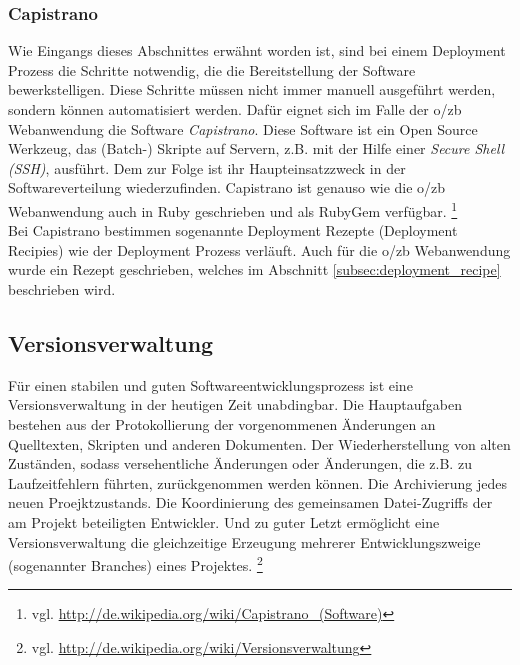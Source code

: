 \documentclass[12pt,             %
               a4paper,          %
               listof=totoc,     %
               index=totoc,      %
               bibliography=totoc,%
               oneside,         %
               BCOR1cm,          %
               english   %
               ]{scrbook}
\begin{document}
\subsubsection{Capistrano}
Wie Eingangs dieses Abschnittes erwähnt worden ist, sind bei einem Deployment Prozess die Schritte notwendig, die die Bereitstellung der Software bewerkstelligen. Diese Schritte müssen nicht immer manuell ausgeführt werden, sondern können automatisiert werden. Dafür eignet sich im Falle der o/zb Webanwendung die Software \textit{Capistrano}. Diese Software ist ein Open Source Werkzeug, das (Batch-) Skripte auf Servern, z.B. mit der Hilfe einer \textit{Secure Shell (SSH)}, ausführt. Dem zur Folge ist ihr Haupteinsatzzweck in der Softwareverteilung wiederzufinden. Capistrano ist genauso wie die o/zb Webanwendung auch in Ruby geschrieben und als RubyGem verfügbar. \footnote{vgl. \url{http://de.wikipedia.org/wiki/Capistrano_(Software)}}\\

Bei Capistrano bestimmen sogenannte Deployment Rezepte (\glqq Deployment Recipies\grqq) wie der Deployment Prozess verläuft. Auch für die o/zb Webanwendung wurde ein Rezept geschrieben, welches im Abschnitt \vref{subsec:deployment_recipe} beschrieben wird.

\subsection{Versionsverwaltung}
Für einen stabilen und guten Softwareentwicklungsprozess ist eine Versionsverwaltung in der heutigen Zeit unabdingbar. Die Hauptaufgaben bestehen aus der Protokollierung der vorgenommenen Änderungen an Quelltexten, Skripten und anderen Dokumenten. Der Wiederherstellung von alten Zuständen, sodass versehentliche Änderungen oder Änderungen, die z.B. zu Laufzeitfehlern führten, zurückgenommen werden können. Die Archivierung jedes neuen Proejktzustands. Die Koordinierung des gemeinsamen Datei-Zugriffs der am Projekt beteiligten Entwickler. Und zu guter Letzt ermöglicht eine Versionsverwaltung die gleichzeitige Erzeugung mehrerer Entwicklungszweige (sogenannter \glqq Branches\grqq) eines Projektes. \footnote{vgl. \url{http://de.wikipedia.org/wiki/Versionsverwaltung}}
\end{document}
